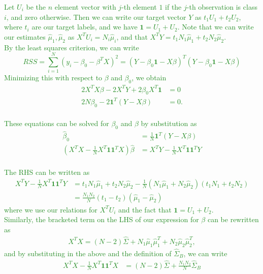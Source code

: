 \documentclass{article}
\begin{document}
\begin{enumerate}[(a)]
    \textcolor{ForestGreen}{Let $U_i$ be the $n$ element vector with $j$-th element $1$ if the $j$-th observation is class $i$, and zero otherwise.  Then we can write our target vector $Y$ as $t_1 U_1 + t_2 U_2$, where $t_i$ are our target labels, and we have $\mathbf{1} = U_1 + U_2$.  Note that we can write our estimates $\hat \mu_1, \hat \mu_2$ as $X^T U_i = N_i \hat \mu_i$, and that $X^T Y = t_1 N_1 \hat \mu_1 + t_2 N_2 \hat \mu_2$. \\
        By the least squares criterion, we can write \[
            RSS = \sum_{i=1}^{N} (y_i - \beta_0 - \beta^T X)^2 = (Y - \beta_0 \mathbf{1} - X \beta)^T (Y - \beta_0 \mathbf{1} - X\beta)
            \] Minimizing this with respect to $\beta$ and $\beta_0$, we obtain \begin{align*} 2 X^T X \beta - 2X^T Y + 2 \beta_0 X^T \mathbf{1} &= 0 \\ 2N \beta_0 - 2 \mathbf{1}^T (Y - X \beta) &= 0. \end{align*} \\
            These equations can be solved for $\beta_0$ and $\beta$ by substitution as \begin{align*} \hat \beta_0 &= \frac{1}{N} \mathbf{1}^T (Y - X\beta) \\
                \left(X^T X - \frac{1}{N}X^T \mathbf{1} \mathbf{1}^T X\right) \hat \beta &= X^T Y - \frac{1}{N} X^T \mathbf{1} \mathbf{1}^T Y
            \end{align*} \\
            The RHS can be written as \begin{align*}
                X^T Y - \frac{1}{N} X^T \mathbf{1} \mathbf{1}^T Y &= t_1 N_1 \hat \mu_1 + t_2 N_2 \hat \mu_2 - \frac{1}{N} (N_1 \hat \mu_1 + N_2 \hat \mu_2)(t_1 N_1 + t_2 N_2) \\
                &= \frac{N_1 N_2}{N} (t_1 - t_2) (\hat \mu_1 - \hat \mu_2)
            \end{align*} where we use our relations for $X^T U_i$ and the fact that $\mathbf{1} = U_1 + U_2$. \\
            Similarly, the bracketed term on the LHS of our expression for $\beta$ can be rewritten as \begin{align*}
                X^T X = (N-2) \hat \Sigma + N_1 \hat \mu_1 \hat \mu_1^T + N_2 \hat \mu_2 \hat \mu_2^T,
            \end{align*} and by substituting in the above and the definition of $\hat \Sigma_B$, we can write \begin{align*}
                X^T X - \frac{1}{N}X^T \mathbf{1} \mathbf{1}^T X &= (N-2) \hat \Sigma + \frac{N_1 N_2}{N} \hat \Sigma_B

\end{align*}}
\end{enumerate}
\end{document}
